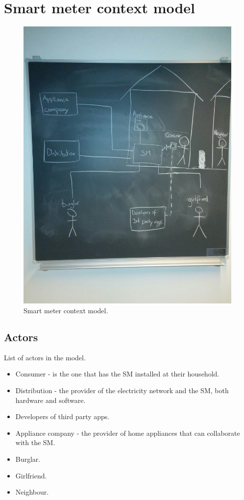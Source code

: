 \section{Smart meter context model}
\begin{figure}
  \includegraphics[width=\textwidth]{figures/situation.jpg}
  \caption{Smart meter context model.}
  
  \label{sm_model}
\end{figure}

\subsection{Actors}
List of actors in the model.
\begin{itemize}
\item Consumer - is the one that has the SM installed at their household.
\item Distribution - the provider of the electricity network and the SM, both hardware and software.
\item Developers of third party apps.
\item Appliance company - the provider of home appliances that can collaborate with the SM.
\item Burglar.
\item Girlfriend.
\item Neighbour.
\end{itemize}

